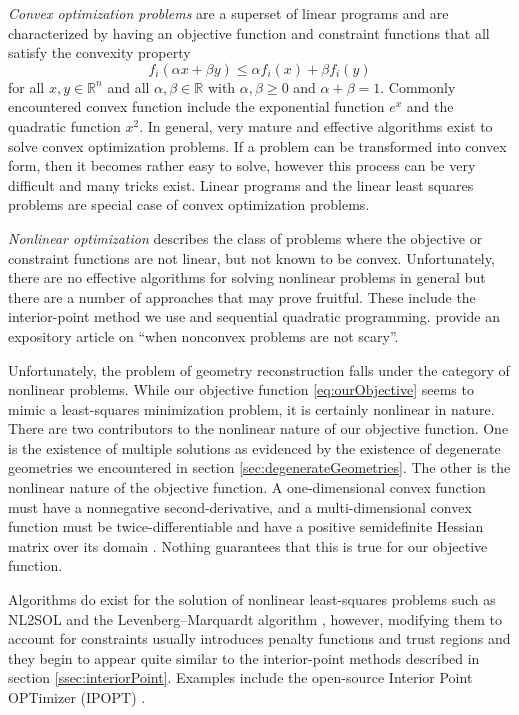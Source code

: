 \emph{Convex optimization problems} are a superset of linear programs and are characterized by having an objective function and constraint functions that all satisfy the convexity property
\begin{equation}
f_i(\alpha x + \beta y) \le \alpha f_i(x) + \beta f_i(y)
\end{equation}
for all $x,y \in \mathbb{R}^n$ and all $\alpha, \beta \in \mathbb{R}$ with $\alpha, \beta \ge 0$ and $\alpha + \beta = 1$. Commonly encountered convex function include the exponential function $e^x$ and the quadratic function $x^2$. In general, very mature and effective algorithms exist to solve convex optimization problems. If a problem can be transformed into convex form, then it becomes rather easy to solve, however this process can be very difficult and many tricks exist. Linear programs and the linear least squares problems are special case of convex optimization problems.

\emph{Nonlinear optimization} describes the class of problems where the objective or constraint functions are not linear, but not known to be convex. Unfortunately, there are no effective algorithms for solving nonlinear problems in general but there are a number of approaches that may prove fruitful. These include the interior-point method we use and sequential quadratic programming. \citet{Sun15} provide an expository article on ``when nonconvex problems are not scary''.

Unfortunately, the problem of geometry reconstruction falls under the category of nonlinear problems. While our objective function \eqref{eq:ourObjective} seems to mimic a least-squares minimization problem, it is certainly nonlinear in nature. There are two contributors to the nonlinear nature of our objective function. One is the existence of multiple solutions as evidenced by the existence of degenerate geometries we encountered in section \ref{sec:degenerateGeometries}. The other is the nonlinear nature of the objective function. A one-dimensional convex function must have a nonnegative second-derivative, and a multi-dimensional convex function must be twice-differentiable and have a positive semidefinite Hessian matrix over its domain \citep[p. 71]{Boyd04}. Nothing guarantees that this is true for our objective function.

Algorithms do exist for the solution of nonlinear least-squares problems such as NL2SOL \citep{Dennis81} and the Levenberg–Marquardt algorithm \citep{Pujol07}, however, modifying them to account for constraints usually introduces penalty functions and trust regions and they begin to appear quite similar to the interior-point methods described in section \ref{ssec:interiorPoint}. Examples include the open-source Interior Point OPTimizer (IPOPT) \citep{Branch99}.


